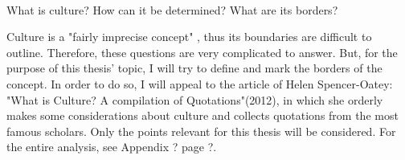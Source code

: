 \documentclass[../main.tex]{subfiles}
\begin{document}
\\

What is culture? How can it be determined? What are its borders? 

Culture is a "fairly imprecise concept" \autocite[293]{elgstrom}, thus its boundaries are difficult to outline. Therefore, these questions are very complicated to answer. But, for the purpose of this thesis' topic, I will try to define and mark the borders of the concept. In order to do so, I will appeal to the article of Helen Spencer-Oatey: "What is Culture? A compilation of Quotations"(2012), in which she orderly makes some considerations about culture and collects quotations from the most famous scholars. Only the points relevant for this thesis will be considered. For the entire analysis, see Appendix ? page ?.
\end{document}
